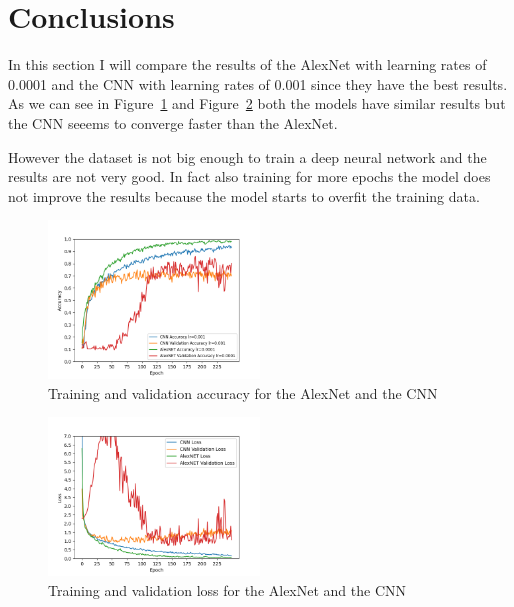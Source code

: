 \section{Conclusions} \label{sec:conclusions}
In this section I will compare the results of the AlexNet with learning rates of 0.0001 and the CNN with learning rates of 0.001 since they have the best results.
As we can see in Figure~\ref{fig:accuracy} and Figure~\ref{fig:loss} both the models have similar results but the CNN seeems to converge faster than the AlexNet.

However the dataset is not big enough to train a deep neural network and the results are not very good.
In fact also training for more epochs the model does not improve the results because the model starts to overfit the training data.

\begin{figure}[h]
    \centering
    \includegraphics[width=0.5\textwidth]{../plot/accuracy.png}
    \caption{Training and validation accuracy for the AlexNet and the CNN}\label{fig:accuracy}
\end{figure}

\begin{figure}[h]
    \centering
    \includegraphics[width=0.5\textwidth]{../plot/loss.png}
    \caption{Training and validation loss for the AlexNet and the CNN}\label{fig:loss}
\end{figure}